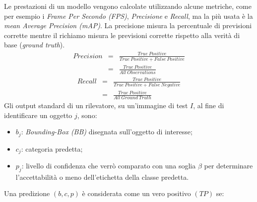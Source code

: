 Le prestazioni di un modello vengono calcolate utilizzando alcune metriche, come 
per esempio i \emph{Frame Per Secondo (FPS)}, \emph{Precisione} e \emph{Recall}, ma la più usata è la 
\emph{mean Average Precision (mAP)}. La precisione misura la percentuale di previsioni 
corrette mentre il richiamo misura le previsioni corrette rispetto alla verità 
di base (\emph{ground truth}).
\begin{eqnarray}\label{precision}
    Precision & = & \frac{True \ Positive}{True \ Positive + False \ Positive} \nonumber \\
             & = & \frac{True \ Positive}{All \ Observations}
\end{eqnarray}
\begin{eqnarray}\label{recall}
    Recall & = & \frac{True \ Positive}{True \ Positive + False \ Negative} \nonumber \\
             & = & \frac{True \ Positive}{All \ Ground \ Truth}
\end{eqnarray}
Gli output standard di un rilevatore, su un’immagine di test $I$, al fine di 
identificare un oggetto $j$, sono:
\begin{itemize}
    \item $b_j$: \emph{Bounding-Box (BB)} disegnata sull’oggetto di interesse;
    \item $c_j$: categoria predetta;
    \item $p_j$: livello di confidenza che verrò comparato con una soglia $\beta$ per determinare 
    l’accettabilità o meno dell’etichetta della classe predetta. 
\end{itemize}
Una predizione $(b,c,p)$ è considerata come un vero positivo $(TP)$ se:
